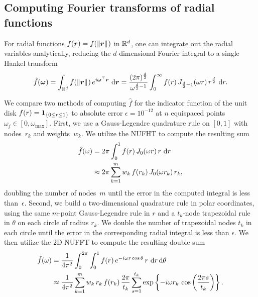 \subsection{Computing Fourier transforms of radial functions}

For radial functions $f(\bm{r}) = f(\left\Vert\bm{r}\right\Vert_{})$ in $\mathbb{R}^d$, one can integrate
out the radial variables analytically, reducing the $d$-dimensional Fourier
integral to a single Hankel transform
\begin{align} \label{eq:radial-fourier}
    \hat{f}(\bm{\omega}) 
    = \int_{\R^d} f(\norm{\bm{r}}) \, e^{i\bm{\omega}^\top \bm{r}} \, \dif{\bm{r}}
    = \frac{(2\pi)^{\frac{d}{2}}}{\omega^{\frac{d}{2} - 1}} \int_0^\infty f(r)
  \, J_{\frac{d}{2} - 1}(\omega r) \, r^{\frac{d}{2}} \, \dif{r}.
\end{align}

We compare two methods of computing $\hat{f}$ for the indicator function of the
unit disk $f(r) = \bm{1}_{\left\{ 0 \leq r \leq 1\right\}}$ to absolute error $\epsilon = 10^{-12}$
at $n$ equispaced points $\omega_j \in [0, \omega_{\text{max}}]$. First, we use
a Gauss-Legendre quadrature rule on $[0,1]$ with nodes~$r_k$ and weights~$w_k$.
We utilize the NUFHT to compute the resulting sum
\begin{equation}
  \begin{aligned}
  \hat{f}(\omega) 
  &= 2\pi\int_0^1 f(r) \, J_0(\omega r) \, r \, \mathop{}\!\mathrm{d}{r} \\
  &\approx 2\pi \sum_{k=1}^m w_k \, f(r_k) \, J_0(\omega r_k) \, r_k,
  \end{aligned}
\end{equation}
doubling the number of nodes~$m$ until the error in the computed integral is
less than~$\epsilon$. Second, we build a two-dimensional quadrature rule in
polar coordinates, using the same $m$-point Gauss-Legendre rule in $r$ and a
$t_k$-node trapezoidal rule in $\theta$ on each circle of radius $r_k$. We
double the number of trapezoidal nodes $t_k$ in each circle until the error in
the corresponding radial integral is less than $\epsilon$. We then utilize the
2D NUFFT to compute the resulting double sum
\begin{align}
  \hat{f}(\omega) 
  &= \frac{1}{4\pi^2} \int_0^{2\pi} \int_0^1 f(r) \, e^{-i\omega r\cos\theta} \,
    r \, \mathop{}\!\mathrm{d}{r} \mathop{}\!\mathrm{d}{\theta} \\
  &\approx \frac{1}{4\pi^2} \sum_{k=1}^{m} w_k \, r_k \, f(r_k) \,
    \frac{2\pi}{t_k}
    \sum_{s=1}^{t_k} \exp\left\{-i\omega r_k \, \cos\left(\frac{2\pi s}{t_k}\right)\right\}.
\end{align}

